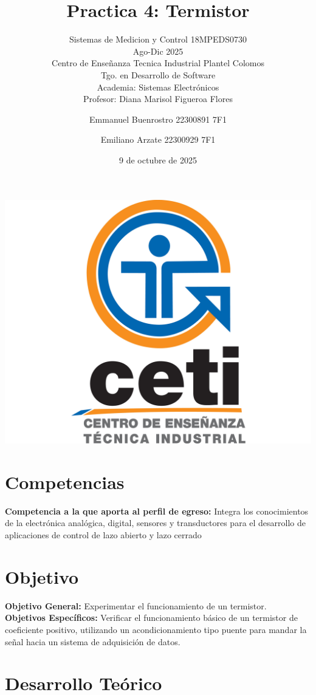 \documentclass[11pt]{scrartcl}
\title {Practica 4: Termistor}
\subtitle{Sistemas de Medicion y Control 18MPEDS0730 \\ Ago-Dic 2025 \\ Centro de Enseñanza Tecnica Industrial Plantel Colomos\\Tgo. en Desarrollo de Software \\ Academia: Sistemas Electrónicos\\Profesor: Diana Marisol Figueroa Flores }
\date{9 de octubre de 2025}
\author{Emmanuel Buenrostro 22300891 7F1 \\ \and Emiliano Arzate 22300929 7F1 \\}
\begin{document}
\maketitle
\begin{center}
   \includegraphics[scale=0.15]{../../cetilogo.jpg} 
\end{center}
\newpage

\section{Competencias}
\textbf{Competencia a la que aporta al perfil de egreso: }
Integra los conocimientos de la electrónica analógica, digital, sensores y transductores para el desarrollo de aplicaciones de control de lazo abierto y lazo cerrado

\section{Objetivo}

\textbf{Objetivo General:}
Experimentar el funcionamiento de un termistor.
\\


\textbf{Objetivos Específicos:} 
Verificar el funcionamiento básico de un termistor de coeficiente positivo, utilizando un acondicionamiento tipo puente para mandar la señal hacia un sistema de adquisición de datos.


\section{Desarrollo Teórico}
\end{document}
